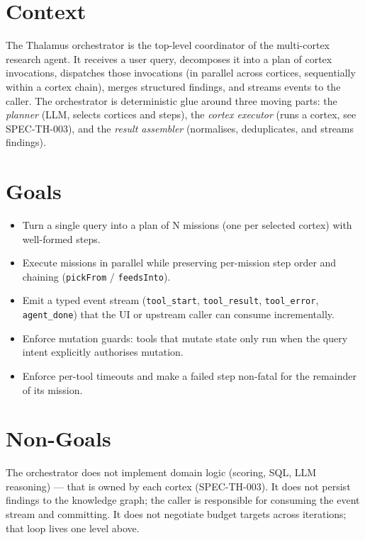 




\makespecheader

\section{Context}
The Thalamus orchestrator is the top-level coordinator of the multi-cortex research agent. It receives a user query, decomposes it into a plan of cortex invocations, dispatches those invocations (in parallel across cortices, sequentially within a cortex chain), merges structured findings, and streams events to the caller. The orchestrator is deterministic glue around three moving parts: the \emph{planner} (LLM, selects cortices and steps), the \emph{cortex executor} (runs a cortex, see SPEC-TH-003), and the \emph{result assembler} (normalises, deduplicates, and streams findings).

\section{Goals}
\begin{itemize}[leftmargin=1.2em]
  \item Turn a single query into a plan of N missions (one per selected cortex) with well-formed steps.
  \item Execute missions in parallel while preserving per-mission step order and chaining (\texttt{pickFrom} / \texttt{feedsInto}).
  \item Emit a typed event stream (\texttt{tool\_start}, \texttt{tool\_result}, \texttt{tool\_error}, \texttt{agent\_done}) that the UI or upstream caller can consume incrementally.
  \item Enforce mutation guards: tools that mutate state only run when the query intent explicitly authorises mutation.
  \item Enforce per-tool timeouts and make a failed step non-fatal for the remainder of its mission.
\end{itemize}

\section{Non-Goals}
\begin{nongoal}
The orchestrator does not implement domain logic (scoring, SQL, LLM reasoning) --- that is owned by each cortex (SPEC-TH-003). It does not persist findings to the knowledge graph; the caller is responsible for consuming the event stream and committing. It does not negotiate budget targets across iterations; that loop lives one level above.
\end{nongoal}

